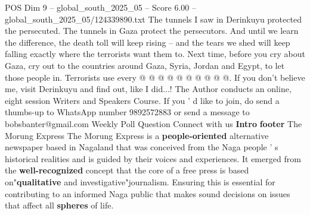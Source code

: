 \begin{textsample}{POS Dim 9 – global\_south\_2025\_05 – Score 6.00 – global\_south\_2025\_05/124339890.txt}
The tunnels I saw in Derinkuyu protected the persecuted.
The tunnels in Gaza protect the persecutors.
And until we learn the difference, the death toll will keep rising -- and the tears we shed will keep falling exactly where the terrorists want them to.
Next time, before you cry about Gaza, cry out to the countries around Gaza, Syria, Jordan and Egypt, to let those people in.
Terrorists use every @ @ @ @ @ @ @ @ @ @.
If you don't believe me, visit Derinkuyu and find out, like I did...!
The Author conducts an online, eight session Writers and Speakers Course.
If you ' d like to join, do send a thumbs-up to WhatsApp number 9892572883 or send a message to bobsbanter@gmail.com Weekly Poll Question Connect with us \textbf{Intro} \textbf{footer} The Morung Express The Morung Express is a \textbf{people-oriented} alternative newspaper based in Nagaland that was conceived from the Naga people ' s historical realities and is guided by their voices and experiences.
It emerged from the \textbf{well-recognized} concept that the core of a free press is based on"\textbf{qualitative} and investigative"journalism.
Ensuring this is essential for contributing to an informed Naga public that makes sound decisions on issues that affect all \textbf{spheres} of life.

\end{textsample}
